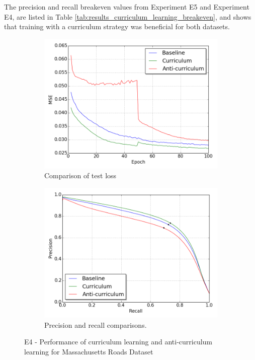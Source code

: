 The precision and recall breakeven values from Experiment E5 and Experiment E4, are listed in Table \ref{tab:results_curriculum_learning_breakeven}, and shows that training with a curriculum strategy was beneficial for both datasets.\\
\begin{figure}
\begin{subfigure}{0.5\textwidth}
\includegraphics[width=\linewidth]{figs/E4/E4-lc.png}
\caption{Comparison of test loss} \label{fig:E4_curr_mass_loss}
\end{subfigure}
\hspace*{\fill} %
\begin{subfigure}{0.5\textwidth}
\includegraphics[width=\linewidth]{figs/E4/E4-pr.png}
\caption{Precision and recall comparisons.} \label{fig:E4_curr_mass_pr}
\end{subfigure}
\hspace*{\fill} %
\caption[E4 - Performance of curriculum learning for Massachusetts Roads Dataset]{E4 - Performance of curriculum learning and anti-curriculum learning for Massachusetts Roads Dataset} \label{fig:E4_curriculum_mass}
\end{figure}

